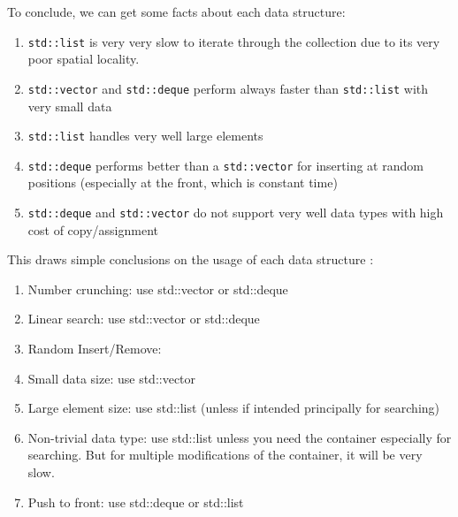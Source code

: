 To conclude, we can get some facts about each data structure: \vspace{-0.3cm}
\begin{enumerate} \itemsep -4pt
\item {\tt std::list} is very very slow to iterate through the collection due to its very poor spatial locality.
\item {\tt std::vector} and {\tt std::deque} perform always faster than {\tt std::list} with very small data
\item {\tt std::list} handles very well large elements
\item {\tt std::deque} performs better than a {\tt std::vector} for inserting at random positions (especially at the front, which is constant time)
\item {\tt std::deque} and {\tt std::vector} do not support very well data types with high cost of copy/assignment
\end{enumerate}



This draws simple conclusions on the usage of each data structure \cite{Bulka2000,Josuttis1999a}: \vspace{-0.3cm}
\begin{enumerate} \itemsep -4pt
\item Number crunching: use std::vector or std::deque
\item Linear search: use std::vector or std::deque
\item Random Insert/Remove:
\item Small data size: use std::vector
\item Large element size: use std::list (unless if intended principally for searching)
\item Non-trivial data type: use std::list unless you need the container especially for searching. But for multiple modifications of the container, it will be very slow.
\item Push to front: use std::deque or std::list
\end{enumerate}

